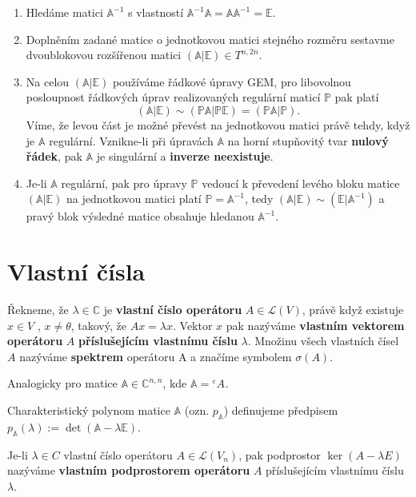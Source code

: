 \documentclass{szzclass}
\newcommand*{\trans}[3]{{}^{#1}#2^{#3}}
\begin{document}
\begin{enumerate}
\item Hledáme matici $\mathbb{A}^{-1}$ s vlastností $\mathbb{A}^{-1}\mathbb{A} = \mathbb{A}\mathbb{A}^{-1} = \mathbb{E}$.
\item Doplněním zadané matice o jednotkovou matici stejného rozměru sestavme dvoublokovou rozšířenou matici $(\mathbb{A} | \mathbb{E}) \in T^{n,2n}$.
\item Na celou $(\mathbb{A} | \mathbb{E})$ používáme řádkové úpravy GEM, pro libovolnou posloupnost řádkových úprav realizovaných regulární maticí $\mathbb{P}$ pak platí
\[
  (\mathbb{A} | \mathbb{E}) \sim (\mathbb{P}\mathbb{A} | \mathbb{P}\mathbb{E}) = (\mathbb{P}\mathbb{A} | \mathbb{P}).
\]
Víme, že levou část je možné převést na jednotkovou matici právě tehdy, když je $\mathbb{A}$ regulární. Vznikne-li při úpravách $\mathbb{A}$ na horní stupňovitý tvar \textbf{nulový řádek}, pak $\mathbb{A}$ je singulární a \textbf{inverze neexistuje}.
\item Je-li $\mathbb{A}$ regulární, pak pro úpravy $\mathbb{P}$ vedoucí k převedení levého bloku matice $(\mathbb{A} | \mathbb{E})$ na jednotkovou matici platí $\mathbb{P} = \mathbb{A}^{-1}$, tedy $(\mathbb{A} | \mathbb{E}) \sim (\mathbb{E} | \mathbb{A}^{-1})$ a pravý blok výsledné matice obsahuje hledanou $\mathbb{A}^{-1}$.
\end{enumerate}

\section{Vlastní čísla}
\begin{definition}
Řekneme, že $\lambda \in \mathbb{C}$ je \textbf{vlastní číslo operátoru} $A \in \mathcal{L}(V)$, právě když existuje $x \in V$ , $x \neq \theta$, takový, že $Ax = \lambda x$. Vektor $x$ pak nazýváme \textbf{vlastním vektorem operátoru} $A$ \textbf{příslušejícím vlastnímu číslu} $\lambda$. Množinu všech vlastních čísel $A$ nazýváme \textbf{spektrem} operátoru A a značíme symbolem $\sigma(A)$.

Analogicky pro matice $\mathbb{A}\in \mathbb{C}^{n,n}$, kde $\mathbb{A}=\trans{\varepsilon}{A}{}$.

Charakteristický polynom matice $\mathbb{A}$ (ozn. $p_\mathbb{A}$) definujeme předpisem $p_\mathbb{A}(\lambda) := \det(\mathbb{A} - \lambda \mathbb{E})$.
\end{definition}

\begin{definition}
Je-li $\lambda \in C$ vlastní číslo operátoru $A \in \mathcal{L}(V_n)$, pak podprostor $\ker{(A-
\lambda E)}$ nazýváme \textbf{vlastním podprostorem operátoru} $A$ příslušejícím vlastnímu
číslu $\lambda$.
\end{definition}
\end{document}
